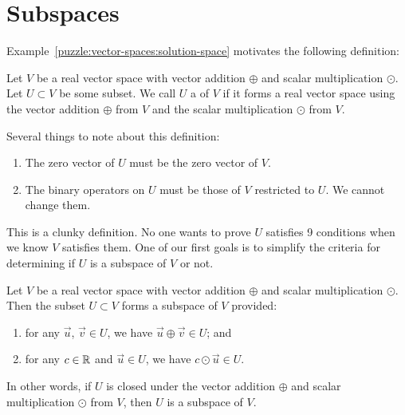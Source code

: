 \section{Subspaces}

\M
Example~\ref{puzzle:vector-spaces:solution-space} motivates the
following definition:

\begin{definition}
Let $V$ be a real vector space with vector addition $\oplus$ and scalar
multiplication $\odot$.
Let $U\subset V$ be some subset. We call $U$ a  of $V$
if
it forms a real vector space using
the vector addition $\oplus$ from $V$ and the scalar multiplication $\odot$ from $V$.
\end{definition}

\begin{remark}
  Several things to note about this definition:
  \begin{enumerate}
  \item The zero vector of $U$ must be the zero vector of $V$.
  \item The binary operators on $U$ must be those of $V$ restricted to
    $U$. We cannot change them.
  \end{enumerate}
\end{remark}

\begin{remark}
This is a clunky definition. No one wants to prove $U$ satisfies 9
conditions when we know $V$ satisfies them. One of our first goals is to
simplify the criteria for determining if $U$ is a subspace of $V$ or not.
\end{remark}

\begin{theorem}\label{thm:subspaces:subset-closed-under-linear-combos-is-a-subspace}
Let $V$ be a real vector space with vector addition $\oplus$ and scalar
multiplication $\odot$. Then the subset $U\subset V$ forms a subspace of
$V$ provided:
\begin{enumerate}
\item for any $\vec{u}$, $\vec{v}\in U$, we have
  $\vec{u}\oplus\vec{v}\in U$; and
\item for any $c\in\mathbb{R}$ and $\vec{u}\in U$, we have $c\odot\vec{u}\in U$.
\end{enumerate}
\end{theorem}

In other words, if $U$ is closed under the vector addition
$\oplus$ and scalar multiplication $\odot$ from $V$, then $U$ is a
subspace of $V$.

